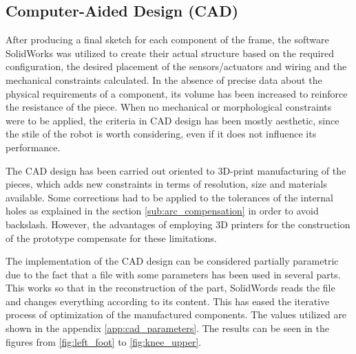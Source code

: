 \subsection{Computer-Aided Design (CAD)} %
\label{sub:computer_aided_design}
After producing a final sketch for each component of the frame, the software SolidWorks was utilized to create their actual structure based on the required configuration, the desired placement of the sensors/actuators and wiring and the mechanical constraints calculated.
In the absence of precise data about the physical requirements of a component, its volume has been increased to reinforce the resistance of the piece.
When no mechanical or morphological constraints were to be applied, the criteria in CAD design has been mostly aesthetic, since the stile of the robot is worth considering, even if it does not influence its performance.

The CAD design has been carried out oriented to 3D-print manufacturing of the pieces, which adds new constraints in terms of resolution, size and materials available.
Some corrections had to be applied to the tolerances of the internal holes as explained in the section \ref{sub:arc_compensation} in order to avoid backslash.
However, the advantages of employing 3D printers for the construction of the prototype compensate for these limitations.

The implementation of the CAD design can be considered partially parametric due to the fact that a file with some parameters has been used in several parts.
This works so that in the reconstruction of the part, SolidWords reads the file and changes everything according to its content.
This has eased the iterative process of optimization of the manufactured components.
The values utilized are shown in the appendix \ref{app:cad_parameters}.
The results can be seen in the figures from \ref{fig:left_foot} to \ref{fig:knee_upper}.

